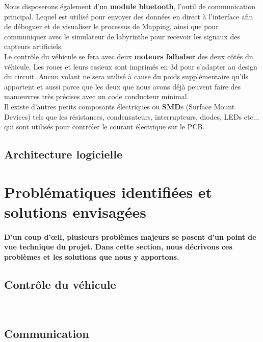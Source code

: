    Nous disposerons également d'un \textbf{module bluetooth}, l'outil de
communication principal.  Lequel est utilisé pour envoyer des données en
direct à l'interface afin de déboguer et de visualiser le processus de
Mapping, ainsi que pour communiquer avec le simulateur de labyrinthe pour
recevoir les signaux des capteurs artificiels. \\


   Le contrôle du véhicule se fera avec deux \textbf{moteurs falhaber}
\cite{faulhaber:1} des deux côtés du véhicule. Les roues et leurs essieux sont
imprimés en 3d pour s'adapter au design du circuit. Aucun volant ne sera
utilisé à cause du poids supplémentaire qu'ils apportent et aussi parce que
les deux que nous avons déjà peuvent faire des manœuvres très précises avec un
code conducteur minimal. \\


   Il existe d'autres petits composants électriques ou \textbf{SMD}s (Surface
Mount Devices) tels que les résistances, condensateurs, interrupteurs,
diodes, LEDs etc... qui sont utilisés pour contrôler le courant électrique
sur le PCB.

\subsection{Architecture logicielle} \label{subsec:vueLogicielle}



\section{Problématiques identifiées et solutions envisagées} \label{sec:problemesSolutions}

\paragraph{
   D'un coup d'œil, plusieurs problèmes majeurs se posent d'un point de vue
technique du projet.  Dans cette section, nous décrivons ces problèmes et
les solutions que nous y apportons.}

\subsection{Contrôle du véhicule} \label{subsec:ctrlComm}


\subsection{Communication} \label{subsec:mapMaze}



